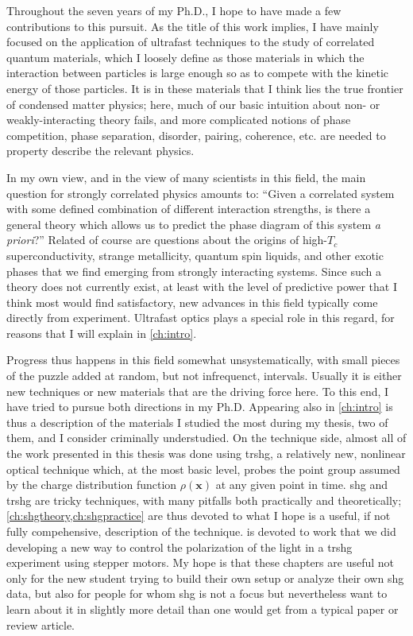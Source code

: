 Throughout the seven years of my Ph.D., I hope to have made a few contributions to this pursuit.
As the title of this work implies, I have mainly focused on the application of ultrafast techniques to the study of correlated quantum materials, which I loosely define as those materials in which the interaction between particles is large enough so as to compete with the kinetic energy of those particles.
It is in these materials that I think lies the true frontier of condensed matter physics; here, much of our basic intuition about non- or weakly-interacting theory fails, and more complicated notions of phase competition, phase separation, disorder, pairing, coherence, etc. are needed to property describe the relevant physics.

In my own view, and in the view of many scientists in this field\citep{alexandradinata_future_2022}, the main question for strongly correlated physics amounts to: ``Given a correlated system with some defined combination of different interaction strengths, is there a general theory which allows us to predict the phase diagram of this system \textit{a priori}?''
Related of course are questions about the origins of high-$T_c$ superconductivity, strange metallicity, quantum spin liquids, and other exotic phases that we find emerging from strongly interacting systems.
Since such a theory does not currently exist, at least with the level of predictive power that I think most would find satisfactory, new advances in this field typically come directly from experiment.
Ultrafast optics plays a special role in this regard, for reasons that I will explain in \cref{ch:intro}.

Progress thus happens in this field somewhat unsystematically, with small pieces of the puzzle added at random, but not infrequenct, intervals.
Usually it is either new techniques or new materials that are the driving force here.
To this end, I have tried to pursue both directions in my Ph.D.
Appearing also in \cref{ch:intro} is thus a description of the materials I studied the most during my thesis, two of them,  and  I consider criminally understudied.
On the technique side, almost all of the work presented in this thesis was done using \gls{trshg}, a relatively new, nonlinear optical technique which, at the most basic level, probes the point group assumed by the charge distribution function $\rho(\bm{x})$ at any given point in time.
\Gls{shg} and \gls{trshg} are tricky techniques, with many pitfalls both practically and theoretically; \cref{ch:shgtheory,ch:shgpractice} are thus devoted to what I hope is a useful, if not fully compehensive, description of the technique.
 is devoted to work that we did developing a new way to control the polarization of the light in a \gls{trshg} experiment using stepper motors.
My hope is that these chapters are useful not only for the new student trying to build their own setup or analyze their own \gls{shg} data, but also for people for whom \gls{shg} is not a focus but nevertheless want to learn about it in slightly more detail than one would get from a typical paper or review article.

